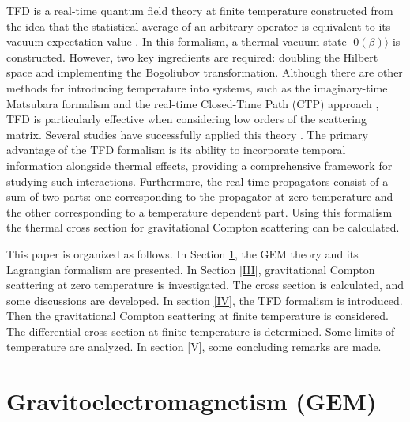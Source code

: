 \documentclass[11pt,showpacs,preprintnumbers,amsmath,amssymb,prd,nofootinbib,superscriptaddress]{revtex4-2}
\begin{document}
TFD is a real-time quantum field theory at finite temperature constructed from the idea that the statistical average of an arbitrary operator is equivalent to its vacuum expectation value \cite{Umezawa1, Umezawa2, Book, Umezawa22, Khanna1, Khanna2, Santana1, Santana2}. In this formalism, a thermal vacuum state $|0(\beta)\rangle$ is constructed. However, two key ingredients are required: doubling the Hilbert space and implementing the Bogoliubov transformation. Although there are other methods for introducing temperature into systems, such as the imaginary-time Matsubara formalism \cite{matsubara} and the real-time Closed-Time Path (CTP) approach \cite{schwinger1961brownian}, TFD is particularly effective when considering low orders of the scattering matrix. Several studies have successfully applied this theory \cite{alesandrogravitacional, Casimir, santos2017lorentz, santos2016quantized, cabral2023thermal, cabral2024lorentz}. The primary advantage of the TFD formalism is its ability to incorporate temporal information alongside thermal effects, providing a comprehensive framework for studying such interactions. Furthermore, the real time propagators consist of a sum of two parts: one corresponding to the propagator at zero temperature and the other corresponding to a temperature dependent part. Using this formalism the thermal cross section for gravitational Compton scattering can be calculated.

This paper is organized as follows. In Section \ref{II}, the GEM theory and its Lagrangian formalism are presented. In Section \ref{III}, gravitational Compton scattering at zero temperature is investigated. The cross section is calculated, and some discussions are developed. In section \ref{IV}, the TFD formalism is introduced. Then the gravitational Compton scattering at finite temperature is considered. The differential cross section at finite temperature is determined. Some limits of temperature are analyzed. In section \ref{V}, some concluding remarks are made.
 
 
\section{Gravitoelectromagnetism (GEM)}\label{II}
\end{document}
